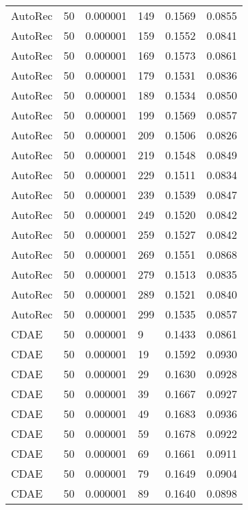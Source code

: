 \begin{tabular}{llrlrr}
 AutoRec &   50 &  0.000001 &   149 &  0.1569 &       0.0855 \\
 AutoRec &   50 &  0.000001 &   159 &  0.1552 &       0.0841 \\
 AutoRec &   50 &  0.000001 &   169 &  0.1573 &       0.0861 \\
 AutoRec &   50 &  0.000001 &   179 &  0.1531 &       0.0836 \\
 AutoRec &   50 &  0.000001 &   189 &  0.1534 &       0.0850 \\
 AutoRec &   50 &  0.000001 &   199 &  0.1569 &       0.0857 \\
 AutoRec &   50 &  0.000001 &   209 &  0.1506 &       0.0826 \\
 AutoRec &   50 &  0.000001 &   219 &  0.1548 &       0.0849 \\
 AutoRec &   50 &  0.000001 &   229 &  0.1511 &       0.0834 \\
 AutoRec &   50 &  0.000001 &   239 &  0.1539 &       0.0847 \\
 AutoRec &   50 &  0.000001 &   249 &  0.1520 &       0.0842 \\
 AutoRec &   50 &  0.000001 &   259 &  0.1527 &       0.0842 \\
 AutoRec &   50 &  0.000001 &   269 &  0.1551 &       0.0868 \\
 AutoRec &   50 &  0.000001 &   279 &  0.1513 &       0.0835 \\
 AutoRec &   50 &  0.000001 &   289 &  0.1521 &       0.0840 \\
 AutoRec &   50 &  0.000001 &   299 &  0.1535 &       0.0857 \\
    CDAE &   50 &  0.000001 &     9 &  0.1433 &       0.0861 \\
    CDAE &   50 &  0.000001 &    19 &  0.1592 &       0.0930 \\
    CDAE &   50 &  0.000001 &    29 &  0.1630 &       0.0928 \\
    CDAE &   50 &  0.000001 &    39 &  0.1667 &       0.0927 \\
    CDAE &   50 &  0.000001 &    49 &  0.1683 &       0.0936 \\
    CDAE &   50 &  0.000001 &    59 &  0.1678 &       0.0922 \\
    CDAE &   50 &  0.000001 &    69 &  0.1661 &       0.0911 \\
    CDAE &   50 &  0.000001 &    79 &  0.1649 &       0.0904 \\
    CDAE &   50 &  0.000001 &    89 &  0.1640 &       0.0898 \\

\end{tabular}
